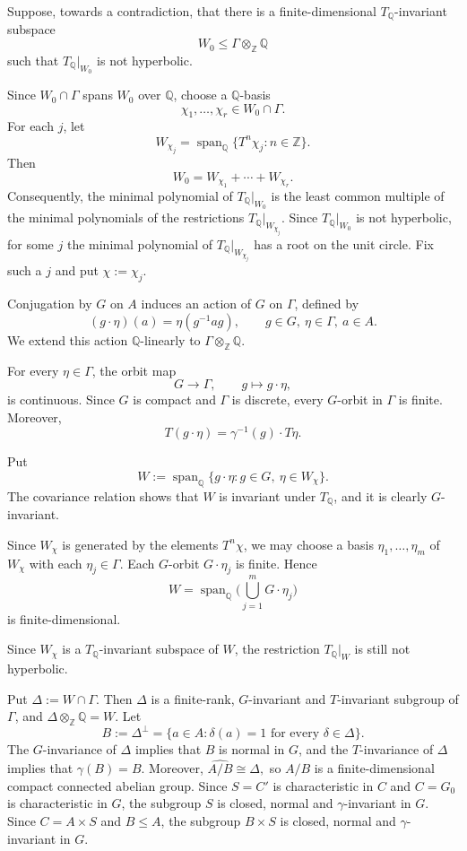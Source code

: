 \documentclass[12pt]{amsart}
\theoremstyle{definition}
\numberwithin{equation}{section}
\theoremstyle{remark}
\begin{document}
Suppose, towards a contradiction, that there is a finite-dimensional
$T_{\mathbb Q}$-invariant subspace
\[
W_0\leq\Gamma\otimes_{\mathbb Z}\mathbb Q
\]
such that $T_{\mathbb Q}|_{W_0}$ is not hyperbolic.

Since $W_0\cap\Gamma$ spans $W_0$ over $\mathbb Q$, choose a
$\mathbb Q$-basis
\[
\chi_1,\ldots,\chi_r\in W_0\cap\Gamma.
\]
For each $j$, let
\[
W_{\chi_j}
=
\operatorname{span}_{\mathbb Q}
\{T^n\chi_j:n\in\mathbb Z\}.
\]
Then
\[
W_0=W_{\chi_1}+\cdots+W_{\chi_r}.
\]
Consequently, the minimal polynomial of $T_{\mathbb Q}|_{W_0}$ is
the least common multiple of the minimal polynomials of the
restrictions $T_{\mathbb Q}|_{W_{\chi_j}}$. Since
$T_{\mathbb Q}|_{W_0}$ is not hyperbolic, for some $j$ the minimal
polynomial of $T_{\mathbb Q}|_{W_{\chi_j}}$ has a root on the unit
circle. Fix such a $j$ and put $\chi:=\chi_j$.


Conjugation by $G$ on $A$ induces an action of $G$ on $\Gamma$,
defined by
\[
(g\cdot\eta)(a)
=
\eta(g^{-1}ag),
\qquad
g\in G,\ \eta\in\Gamma,\ a\in A.
\]
We extend this action $\mathbb Q$-linearly to
$\Gamma\otimes_{\mathbb Z}\mathbb Q$.

For every $\eta\in\Gamma$, the orbit map
\[
G\longrightarrow\Gamma,\qquad g\longmapsto g\cdot\eta,
\]
is continuous. Since $G$ is compact and $\Gamma$ is discrete, every
$G$-orbit in $\Gamma$ is finite. Moreover,
\[
T(g\cdot\eta)
=
\gamma^{-1}(g)\cdot T\eta.
\]

Put
\[
W
:=
\operatorname{span}_{\mathbb Q}
\{g\cdot\eta:g\in G,\ \eta\in W_\chi\}.
\]
The covariance relation shows that $W$ is invariant under
$T_{\mathbb Q}$, and it is clearly $G$-invariant.

Since $W_\chi$ is generated by the elements $T^n\chi$, we may choose
a basis
$
\eta_1,\ldots,\eta_m
$
of $W_\chi$ with each $\eta_j\in\Gamma$. Each $G$-orbit
$G\cdot\eta_j$ is finite. Hence
\[
W
=
\operatorname{span}_{\mathbb Q}
\big(\bigcup_{j=1}^mG\cdot\eta_j\big)
\]
is finite-dimensional.

 Since $W_\chi$ is a $T_{\mathbb Q}$-invariant
subspace of $W$, the restriction $T_{\mathbb Q}|_W$ is still not
hyperbolic.

Put
$
\Delta:=W\cap\Gamma.
$
Then $\Delta$ is a finite-rank, $G$-invariant and $T$-invariant
subgroup of $\Gamma$, and
$
\Delta\otimes_{\mathbb Z}\mathbb Q=W.
$
Let
\[
B:=\Delta^\perp
=
\{a\in A:\delta(a)=1\text{ for every }\delta\in\Delta\}.
\]
The $G$-invariance of $\Delta$ implies that $B$ is normal in $G$, and
the $T$-invariance of $\Delta$ implies that $\gamma(B)=B$. Moreover,
$
\widehat{A/B}\cong\Delta,
$
so $A/B$ is a finite-dimensional compact connected abelian group. Since $S=C'$ is characteristic in $C$ and $C=G_0$ is characteristic
in $G$, the subgroup $S$ is closed, normal and $\gamma$-invariant in
$G$. Since $C=A\times S$ and $B\leq A$, the subgroup $B\times S$ is
closed, normal and $\gamma$-invariant in $G$.
\end{document}
